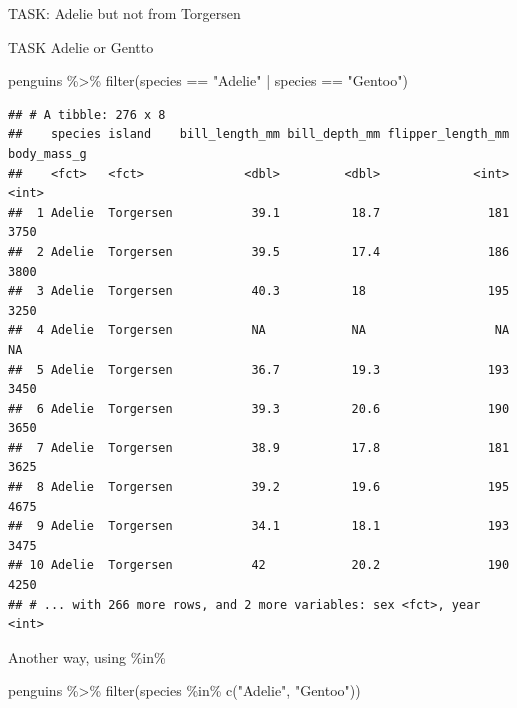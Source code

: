 \documentclass[
]{article}
\newenvironment{Shaded}{\begin{snugshade}}{\end{snugshade}}
\newcommand{\FunctionTok}[1]{\textcolor[rgb]{0.00,0.00,0.00}{#1}}
\newcommand{\NormalTok}[1]{#1}
\newcommand{\SpecialCharTok}[1]{\textcolor[rgb]{0.00,0.00,0.00}{#1}}
\newcommand{\StringTok}[1]{\textcolor[rgb]{0.31,0.60,0.02}{#1}}
\begin{document}
TASK: Adelie but not from Torgersen

TASK Adelie or Gentto

\textbar{}

\begin{Shaded}
\begin{Highlighting}[]
\NormalTok{penguins }\SpecialCharTok{\%\textgreater{}\%} 
  \FunctionTok{filter}\NormalTok{(species }\SpecialCharTok{==} \StringTok{"Adelie"} \SpecialCharTok{|}\NormalTok{ species }\SpecialCharTok{==} \StringTok{"Gentoo"}\NormalTok{)}
\end{Highlighting}
\end{Shaded}

\begin{verbatim}
## # A tibble: 276 x 8
##    species island    bill_length_mm bill_depth_mm flipper_length_mm body_mass_g
##    <fct>   <fct>              <dbl>         <dbl>             <int>       <int>
##  1 Adelie  Torgersen           39.1          18.7               181        3750
##  2 Adelie  Torgersen           39.5          17.4               186        3800
##  3 Adelie  Torgersen           40.3          18                 195        3250
##  4 Adelie  Torgersen           NA            NA                  NA          NA
##  5 Adelie  Torgersen           36.7          19.3               193        3450
##  6 Adelie  Torgersen           39.3          20.6               190        3650
##  7 Adelie  Torgersen           38.9          17.8               181        3625
##  8 Adelie  Torgersen           39.2          19.6               195        4675
##  9 Adelie  Torgersen           34.1          18.1               193        3475
## 10 Adelie  Torgersen           42            20.2               190        4250
## # ... with 266 more rows, and 2 more variables: sex <fct>, year <int>
\end{verbatim}

Another way, using \%in\%

\begin{Shaded}
\begin{Highlighting}[]
\NormalTok{penguins }\SpecialCharTok{\%\textgreater{}\%} 
  \FunctionTok{filter}\NormalTok{(species }\SpecialCharTok{\%in\%} \FunctionTok{c}\NormalTok{(}\StringTok{"Adelie"}\NormalTok{, }\StringTok{"Gentoo"}\NormalTok{))}
\end{Highlighting}
\end{Shaded}
\end{document}
